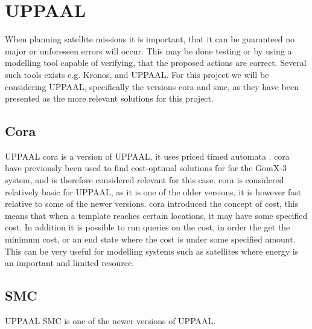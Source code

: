 \section{UPPAAL}

When planning satellite missions it is important, that it can be guaranteed no major or unforeseen errors will occur. This may be done testing or by using a modelling tool capable of verifying, that the proposed actions are correct\cite{cs_smc}. Several such tools exists e.g. Kronos, and UPPAAL. For this project we will be considering UPPAAL, specifically the versions \gls{cora} and \gls{smc}, as they have been presented as the more relevant solutions for this project.

\subsection{Cora}
UPPAAL \gls{cora} is a version of UPPAAL, it uses priced timed automata \cite{cs_cora}. \Gls{cora} have previously been used to find cost-optimal solutions for for the GomX-3 system\cite{gomx3}, and is therefore considered relevant for this case.
\Gls{cora} is considered relatively basic for UPPAAL, as it is one of the older versions, it is however fast relative to some of the newer versions. \Gls{cora} introduced the concept of cost, this means that when a template reaches certain locations, it may have some specified cost. In addition it is possible to run queries on the cost, in order the get the minimum cost, or an end state where the cost is under some specified amount.
This can be very useful for modelling systems such as satellites where energy is an important and limited resource.

\subsection{SMC}
UPPAAL SMC is one of the newer versions of UPPAAL.


